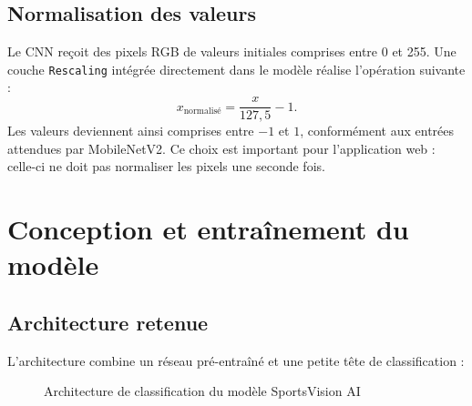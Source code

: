 \documentclass[11pt,a4paper,oneside]{report}
\begin{document}
\section{Normalisation des valeurs}
Le CNN reçoit des pixels RGB de valeurs initiales comprises entre 0 et 255. Une couche \texttt{Rescaling} intégrée directement dans le modèle réalise l'opération suivante :
\begin{equation}
x_{\mathrm{normalisé}}=\frac{x}{127{,}5}-1.
\end{equation}
Les valeurs deviennent ainsi comprises entre $-1$ et $1$, conformément aux entrées attendues par MobileNetV2. Ce choix est important pour l'application web : celle-ci ne doit pas normaliser les pixels une seconde fois.

\chapter{Conception et entraînement du modèle}
\section{Architecture retenue}
L'architecture combine un réseau pré-entraîné et une petite tête de classification :
\begin{figure}[H]\centering
{}
\caption{Architecture de classification du modèle SportsVision AI}
\end{figure}
\end{document}
